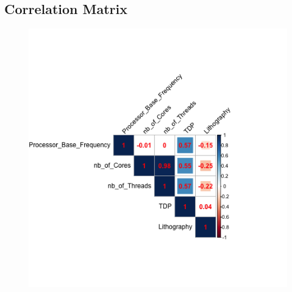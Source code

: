 \subsection{Correlation Matrix}
\begin{figure}[H]
    \begin{center}
    \includegraphics[width=14cm]{graphics/corr_matrix.png}
    \end{center}
\end{figure}

